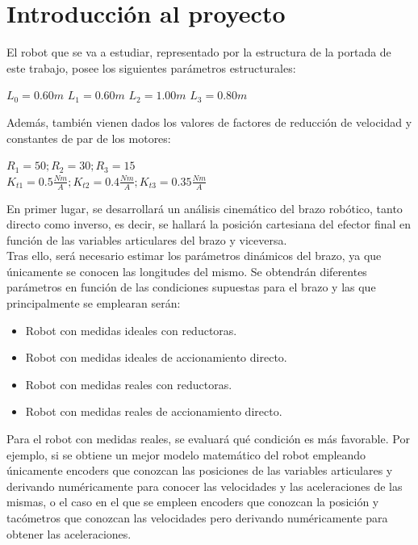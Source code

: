 \documentclass[a4paper,twoside]{article}
\begin{document}
\section{Introducción al proyecto}
	El robot que se va a estudiar, representado por la estructura de la portada de este trabajo, posee los siguientes parámetros estructurales:
	\begin{center}
		$L_0 = 0.60 m$ \hspace{0.5 cm} $L_1 = 0.60 m$ \hspace{0.5 cm}  $L_2 = 1.00 m$\hspace{0.5 cm}  $L_3 = 0.80 m$
	\end{center}

	Además, también vienen dados los valores de factores de reducción de velocidad y constantes de par de los motores:
	\begin{center}
		$R_1 = 50; R_2 = 30; R_3 = 15$\\ \vspace{0.2 cm}
		$K_{t1} = 0.5 \frac{Nm}{A}; K_{t2} = 0.4 \frac{Nm}{A}; K_{t3} = 0.35 \frac{Nm}{A}$
	\end{center}
En primer lugar, se desarrollará un análisis cinemático del brazo robótico, tanto directo como inverso, es decir, se hallará la posición cartesiana del efector final en función de las variables articulares del brazo y viceversa.\\
Tras ello, será necesario estimar los parámetros dinámicos del brazo, ya que únicamente se conocen las longitudes del mismo. Se obtendrán diferentes parámetros en función de las condiciones supuestas para el brazo y las que principalmente se emplearan serán:
\begin{itemize}
	\item Robot con medidas ideales con reductoras.
	\item Robot con medidas ideales de accionamiento directo.
	\item Robot con medidas reales con reductoras.
	\item Robot con medidas reales de accionamiento directo.
\end{itemize}
Para el robot con medidas reales, se evaluará qué condición es más favorable. Por ejemplo, si se obtiene un mejor modelo matemático del robot empleando únicamente encoders que conozcan las posiciones de las variables articulares y derivando numéricamente para conocer las velocidades y las aceleraciones de las mismas, o el caso en el que se empleen encoders que conozcan la posición y tacómetros que conozcan las velocidades pero derivando numéricamente para obtener las aceleraciones.\\
\end{document}
